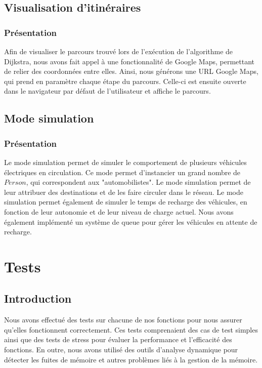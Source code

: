 \documentclass[french,a4paper]{article}
\begin{document}
    \subsection{Visualisation d'itinéraires}

    \subsubsection{Présentation}

    Afin de visualiser le parcours trouvé lors de l'exécution de l'algorithme de Dijkstra, nous avons fait appel à une fonctionnalité de Google Maps, permettant de relier des coordonnées entre elles. Ainsi, nous générons une URL Google Maps, qui prend en paramètre chaque étape du parcours. Celle-ci est ensuite ouverte dans le navigateur par défaut de l'utilisateur et affiche le parcours.

    \subsection{Mode simulation}
    \subsubsection{Présentation}
    Le mode simulation permet de simuler le comportement de plusieurs véhicules électriques en circulation. Ce mode permet d'instancier un grand nombre de $Person$, qui correspondent aux "automobilistes". Le mode simulation permet de leur attribuer des destinations et de les faire circuler dans le réseau. Le mode simulation permet également de simuler le temps de recharge des véhicules, en fonction de leur autonomie et de leur niveau de charge actuel. Nous avons également implémenté un système de queue pour gérer les véhicules en attente de recharge.


    \section{Tests}

    \subsection{Introduction}
    Nous avons effectué des tests sur chacune de nos fonctions pour nous assurer qu'elles fonctionnent correctement. Ces tests comprenaient des cas de test simples ainsi que des tests de stress pour évaluer la performance et l'efficacité des fonctions. En outre, nous avons utilisé des outils d'analyse dynamique pour détecter les fuites de mémoire et autres problèmes liés à la gestion de la mémoire.
\end{document}
